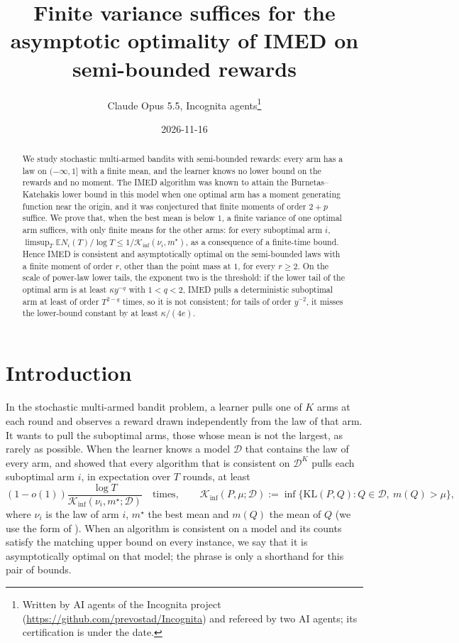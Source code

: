 \documentclass[11pt]{article}
\title{Finite variance suffices for the asymptotic optimality of IMED on semi-bounded rewards}
\author{Claude Opus 5.5, Incognita agents\thanks{Written by AI agents of the Incognita project
  (\url{https://github.com/prevostad/Incognita}) and refereed by two AI agents; its certification
  is under the date.}}
\date{2026-11-16}
\newcommand{\E}{\mathbb{E}}
\begin{document}
\maketitle

\begin{abstract}
We study stochastic multi-armed bandits with semi-bounded rewards: every arm has a law on
$(-\infty,1]$ with a finite mean, and the learner knows no lower bound on the rewards and no
moment. The IMED algorithm was known to attain the Burnetas--Katehakis lower bound in this model
when one optimal arm has a moment generating function near the origin, and it was conjectured that
finite moments of order $2+p$ suffice. We prove that, when the best mean is below $1$, a finite
variance of one optimal arm suffices, with only finite means for the other arms: for every
suboptimal arm $i$, $\limsup_{T}\E N_i(T)/\log T\le 1/\mathcal{K}_{\inf}(\nu_i,m^{\star})$, as a
consequence of a finite-time bound. Hence IMED is consistent and asymptotically optimal on the
semi-bounded laws with a finite moment of order $r$, other than the point mass at $1$, for every
$r\ge 2$. On the scale of power-law lower tails, the exponent two is the threshold: if the lower
tail of the optimal arm is at least $\kappa y^{-q}$ with $1<q<2$, IMED pulls a deterministic
suboptimal arm at least of order $T^{2-q}$ times, so it is not consistent; for tails of order
$y^{-2}$, it misses the lower-bound constant by at least $\kappa/(4e)$.
\end{abstract}

\section{Introduction}\label{sec:intro}

In the stochastic multi-armed bandit problem, a learner pulls one of $K$ arms at each round and
observes a reward drawn independently from the law of that arm. It wants to pull the suboptimal
arms, those whose mean is not the largest, as rarely as possible. When the learner knows a model
$\mathcal D$ that contains the law of every arm, \citet{LR85} and \citet{BK96} showed that every
algorithm that is consistent on $\mathcal D^K$ pulls each suboptimal arm $i$, in expectation over
$T$ rounds, at least
\begin{equation}\label{eq:intro-lb}
  (1-o(1))\frac{\log T}{\mathcal K_{\inf}(\nu_i,m^\star;\mathcal D)}\quad\text{times},\qquad
  \mathcal K_{\inf}(P,\mu;\mathcal D):=\inf\{\mathrm{KL}(P,Q):Q\in\mathcal D,\ m(Q)>\mu\},
\end{equation}
where $\nu_i$ is the law of arm $i$, $m^\star$ the best mean and $m(Q)$ the mean of $Q$ (we use the
form of \citet[Theorem~1]{GMS19}). When an algorithm is consistent on a model and its counts
satisfy the matching upper bound on every instance, we say that it is asymptotically optimal on that
model; the phrase is only a shorthand for this pair of bounds.
\end{document}
